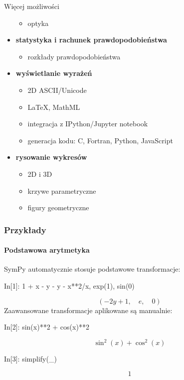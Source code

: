 \documentclass[10pt]{beamer}
\begin{document}
\begin{frame}{Więcej możliwości}
\begin{multicols}{2}
\begin{itemize}
\begin{itemize}
          \item optyka
        \end{itemize}
      \item \textbf{statystyka i rachunek prawdopodobieństwa}
        \begin{itemize}
          \tiny
          \item rozkłady prawdopodobieństwa
        \end{itemize}
      \item \textbf{wyświetlanie wyrażeń}
        \begin{itemize}
          \tiny
          \item 2D ASCII/Unicode
          \item LaTeX, MathML
          \item integracja z IPython/Jupyter notebook
          \item generacja kodu: C, Fortran, Python, JavaScript
        \end{itemize}
      \item \textbf{rysowanie wykresów}
        \begin{itemize}
          \tiny
          \item 2D i 3D
          \item krzywe parametryczne
          \item figury geometryczne
        \end{itemize}
    \end{itemize}
  \end{multicols}
\end{frame}

\begin{frame}[fragile]
  \frametitle{Przykłady}
  \framesubtitle{Podstawowa arytmetyka}

  SymPy automatycznie stosuje podstawowe transformacje:
  \begin{python}
    In[1]: 1 + x - y - y - x**2/x, exp(1), sin(0)
  \end{python}
  \begin{equation*}
    \left ( - 2 y + 1, \quad e, \quad 0\right )
  \end{equation*}
  Zaawansowane transformacje aplikowane są manualnie:
  \begin{python}
    In[2]: sin(x)**2 + cos(x)**2
  \end{python}
  \begin{equation*}
    \sin^{2}{\left (x \right )} + \cos^{2}{\left (x \right )}
  \end{equation*}

  \begin{python}
    In[3]: simplify(_)
  \end{python}
  \begin{equation*}
    1
  \end{equation*}
\end{frame}
\end{document}
